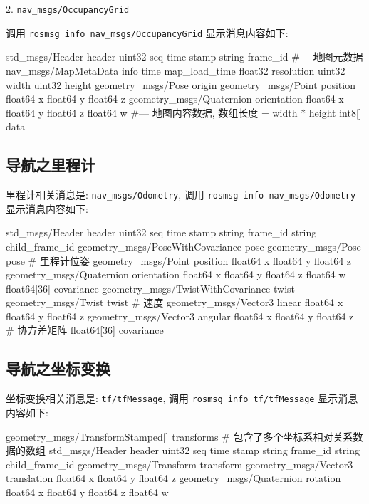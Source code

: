 \documentclass[openany, fontset=windowsold]{ctexbook}
\theoremstyle{kaiti}
\theoremstyle{normal}
\begin{document}
2. \verb|nav_msgs/OccupancyGrid|

调用 \verb|rosmsg info nav_msgs/OccupancyGrid| 显示消息内容如下:

\begin{bash}
  std_msgs/Header header
    uint32 seq
    time stamp
    string frame_id
  #--- 地图元数据
  nav_msgs/MapMetaData info
    time map_load_time
    float32 resolution
    uint32 width
    uint32 height
    geometry_msgs/Pose origin
      geometry_msgs/Point position
        float64 x
        float64 y
        float64 z
      geometry_msgs/Quaternion orientation
        float64 x
        float64 y
        float64 z
        float64 w
  #--- 地图内容数据, 数组长度 = width * height
  int8[] data
\end{bash}

\subsection{导航之里程计}

里程计相关消息是: \verb|nav_msgs/Odometry|, 调用 \verb|rosmsg info nav_msgs/Odometry| 显示消息内容如下:

\begin{bash}
  std_msgs/Header header
    uint32 seq
    time stamp
    string frame_id
  string child_frame_id
  geometry_msgs/PoseWithCovariance pose
    geometry_msgs/Pose pose # 里程计位姿
      geometry_msgs/Point position
        float64 x
        float64 y
        float64 z
      geometry_msgs/Quaternion orientation
        float64 x
        float64 y
        float64 z
        float64 w
    float64[36] covariance
  geometry_msgs/TwistWithCovariance twist
    geometry_msgs/Twist twist # 速度
      geometry_msgs/Vector3 linear
        float64 x
        float64 y
        float64 z
      geometry_msgs/Vector3 angular
        float64 x
        float64 y
        float64 z    
    # 协方差矩阵
    float64[36] covariance
\end{bash}

\subsection{导航之坐标变换}

坐标变换相关消息是: \verb|tf/tfMessage|, 调用 \verb|rosmsg info tf/tfMessage| 显示消息内容如下:

\begin{bash}
  geometry_msgs/TransformStamped[] transforms # 包含了多个坐标系相对关系数据的数组
    std_msgs/Header header
      uint32 seq
      time stamp
      string frame_id
    string child_frame_id
    geometry_msgs/Transform transform
      geometry_msgs/Vector3 translation
        float64 x
        float64 y
        float64 z
      geometry_msgs/Quaternion rotation
        float64 x
        float64 y
        float64 z
        float64 w
\end{bash}
\end{document}
